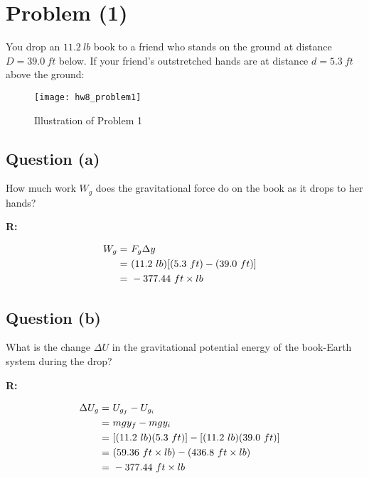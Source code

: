 \section{Problem (1)}
	You drop an $11.2 \ lb$ book to a friend who stands on the ground at distance $D = 39.0 \ ft$ below. If your friend's outstretched hands are at distance $d = 5.3 \ ft$ above the ground:

	\begin{figure}[H]
		\begin{center}
			\texttt{[image: hw8\_problem1]}
			\caption{Illustration of Problem 1}
			\label{fig:hw8_problem1}
		\end{center}
	\end{figure}

	\subsection{Question (a)}

		How much work $W_{g}$ does the gravitational force do on the book as it drops to her hands?

		\textbf{R:}

		\begin{align}
			W_{g} = \ &F_{g} \Delta y& \notag \\
			= \ &(11.2 \ lb) [(5.3 \ ft) - (39.0 \ ft)]& \notag \\
			= \ &- 377.44 \ ft \times lb&
		\end{align}

	\subsection{Question (b)}

		What is the change $\Delta U$ in the gravitational potential energy of the book-Earth system during the drop?

		\textbf{R:}

		\begin{align}
			\Delta U_{g} = \ &U_{g_{f}} - U_{g_{i}}& \notag \\
			= \ &mgy_{f} - mgy_{i}& \notag \\
			= \ &[(11.2 \ lb)(5.3 \ ft)] - [(11.2 \ lb)(39.0 \ ft)]& \notag \\
			= \ &(59.36 \ ft \times lb) - (436.8 \ ft \times lb)& \notag \\
			= \ &-377.44 \ ft \times lb&
		\end{align}
